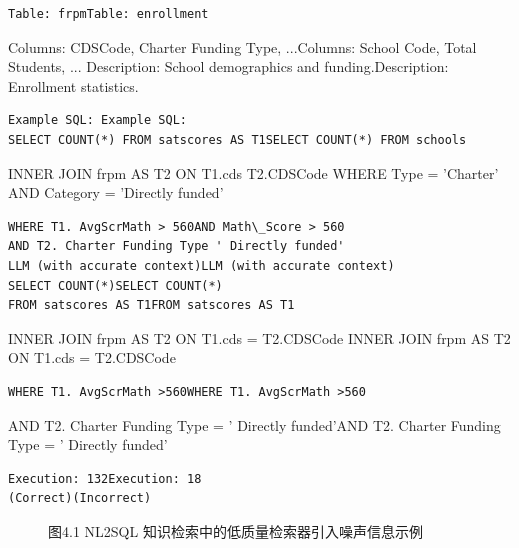 \documentclass[12pt,a4paper,openright,UTF8]{ctexbook}
\begin{document}
\begin{lstlisting}
Table: frpmTable: enrollment
\end{lstlisting}
Columns: CDSCode, Charter Funding Type, ...Columns: School Code, Total Students, ... Description: School demographics and funding.Description: Enrollment statistics.

\begin{lstlisting}
Example SQL: Example SQL:
SELECT COUNT(*) FROM satscores AS T1SELECT COUNT(*) FROM schools
\end{lstlisting}
INNER JOIN frpm AS T2 ON T1.cds T2.CDSCode WHERE Type = 'Charter' AND Category = 'Directly funded'

\begin{lstlisting}
WHERE T1. AvgScrMath > 560AND Math\_Score > 560
AND T2. Charter Funding Type ' Directly funded'
LLM (with accurate context)LLM (with accurate context)
SELECT COUNT(*)SELECT COUNT(*)
FROM satscores AS T1FROM satscores AS T1
\end{lstlisting}
INNER JOIN frpm AS T2 ON T1.cds = T2.CDSCode INNER JOIN frpm AS T2 ON T1.cds = T2.CDSCode

\begin{lstlisting}
WHERE T1. AvgScrMath >560WHERE T1. AvgScrMath >560
\end{lstlisting}
AND T2. Charter Funding Type = ' Directly funded'AND T2. Charter Funding Type = ' Directly funded'

\begin{lstlisting}
Execution: 132Execution: 18
(Correct)(Incorrect)
\end{lstlisting}

\begin{figure}[htbp]
\centering
{}
\caption{图4.1 NL2SQL 知识检索中的低质量检索器引入噪声信息示例}
\end{figure}
\end{document}
